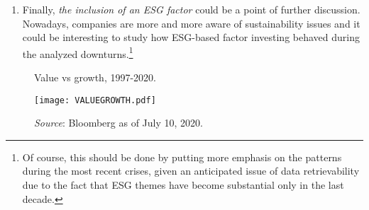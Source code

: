 \documentclass[12pt]{article}
\begin{document}
\begin{enumerate}
\item Finally, \textit{the inclusion of an ESG factor} could be a point of further discussion. Nowadays, companies are more and more aware of sustainability issues and it could be interesting to study how ESG-based factor investing behaved during the analyzed downturns.\footnote{Of course, this should be done by putting more emphasis on the patterns during the most recent crises, given an anticipated issue of data retrievability due to the fact that ESG themes have become substantial only in the last decade.}
\end{enumerate}

\newpage
\appendix
\appendixpage
\addappheadtotoc

\begin{figure}[h]
\begin{center}
\caption{Value vs growth, 1997-2020.}
\label{VALUEGROWTH}
\texttt{[image: VALUEGROWTH.pdf]}
\caption*{\textit{Source}: Bloomberg as of July 10, 2020.}
\end{center}
\end{figure}

\begin{table}[H]
\begin{center}
\caption{Equity style factors' variance inflation factor (VIF) for the Dot-com bubble.}
\label{VIF_dot-com}
\end{center}
\end{table}
\end{document}
